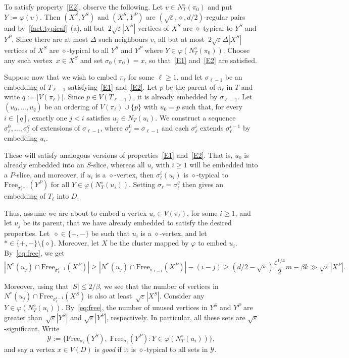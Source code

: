 \documentclass[11pt]{article}
\numberwithin{equation}{section}
\renewcommand{\geq}{\geqslant}
\renewcommand{\leq}{\leqslant}
\newcommand{\defi}[1]{\emph{\color{red!50!black}#1}}
\def\Free{\mathrm{Free}}
\let\eps=\varepsilon
\let\phi=\varphi
\theoremstyle{definition}
\def\eps{{\varepsilon}}
\begin{document}
To satisfy property~\ref{E2}, observe the following. Let $v \in N_T^{\diamond}(\pi_0)$ and put $Y := \phi(v)$. Then $(X^{S},Y^{S})$ and $(X^{S}, Y^{P})$ are $(\sqrt{\eps},\diamond,d/2)$-regular pairs and by~\cref{fact:typical}~(a), all but~$2\sqrt{\eps}|X^{S}|$ vertices of $X^{S}$ are $\diamond$-typical to $Y^{S}$ and $Y^{P}$. Since there are at most $\Delta$ such neighbours $v$,  all but at most~$2\sqrt{\eps} \Delta |X^{S}|$ vertices of $X^{S}$ are $\diamond$-typical to all $Y^{S}$ and $Y^{P}$ where $Y\in \phi(N^{\diamond}_T(\pi_0))$. Choose any such vertex~${x\in X^{S}}$ and set $\sigma_0(\pi_0) = x$, so that~\ref{E1} and~\ref{E2} are satisfied.

Suppose now that we wish to embed $\pi_\ell$ for some $\ell\geq 1$, and let $\sigma_{\ell-1}$ be an embedding of
$T_{\ell-1}$ satisfying~\ref{E1} and~\ref{E2}. Let $p$ be the parent of $\pi_\ell$ in $T$ and
write $q := |V(\pi_\ell)|$. Since $p \in V(T_{\ell-1})$, it is already embedded by $\sigma_{\ell-1}$.
Let $(u_0,\dots,u_{q})$ be an ordering of $V(\pi_\ell) \cup \{p \}$
with $u_0 = p$ such that, for every $i\in [q]$, exactly one $j<i$ satisfies $u_j \in N_T(u_i)$.
We construct a sequence $\sigma_{\ell}^{0},\dots,\sigma_{\ell}^{q}$ of extensions of $\sigma_{\ell-1}$,
where $\sigma_{\ell}^{0} = \sigma_{\ell-1}$ and each $\sigma_{\ell}^{i}$ extends $\sigma_{\ell}^{i-1}$ by embedding $u_i$. 

These will
satisfy analogous versions of properties~\ref{E1} and~\ref{E2}. That is, $u_0$ is already embedded into an $S$-slice, whereas all $u_i$ with $i\geq 1$ will be embedded into a $P$-slice, and moreover, if $u_i$ is a $\diamond$-vertex, then $\sigma_{\ell}^i(u_i)$ is $\diamond$-typical to $\Free_{\sigma_{\ell}^{i-1}}(Y^P)$ for all $Y\in \varphi(N^\diamond_T(u_i))$.
Setting $\sigma_{\ell} = \sigma_{\ell}^{q}$ then gives an embedding of $T_{\ell}$ into $D$.

Thus, assume we are about to embed a vertex $u_i \in V(\pi_\ell)$, for some $i \geq 1$, and let $u_j$ be its parent, that we have already embedded to satisfy the desired properties.
Let~$\diamond\in \{+,-\}$ be such that $u_i$ is a $\diamond$-vertex,
and let $\ast\in \{+,-\} \setminus \{\diamond\}$.
Moreover, let $X$ be the cluster mapped by $\varphi$ to embed $u_i$.
By~\eqref{eq:free}, we get
\[
  |N^{\ast}(u_j) \cap \Free_{\sigma_{\ell}^{i-1}}(X^{P})| \geq |N^{\ast}(u_j)\cap \Free_{\sigma_{\ell-1}}(X^{P})| - (i-j) \geq (d/2-\sqrt{\eps})\frac{\eps^{1/4}}{2}m - \beta k \gg \sqrt{\eps}|X^{P}|.
\]

Moreover, using that $|S| \leq 2/\beta$, we see that  the number of vertices in $N^{\ast}(u_j) \cap \Free_{\sigma_{\ell}^{i-1}}(X^{S})$
is also at least~$\sqrt{\eps}|X^{S}|$. Consider any~$Y\in \phi(N_T^{\diamond}(u_i))$. By~\eqref{eq:free},
the number of unused vertices in $Y^{S}$ and $Y^{P}$ are greater than~$\sqrt{\eps}|Y^S|$ and $\sqrt{\eps}|Y^{P}|$, respectively.
In particular, all these sets are $\sqrt{\eps}$-significant. Write
\[
    \mathcal{Y} := \{ \Free_{\sigma_{\ell}}(Y^S),\; \Free_{\sigma_{\ell}}(Y^{P}) : Y \in \phi(N^{\diamond}_T(u_i))\},
\]
and say a vertex $x \in V(D)$ is \defi{good} if it is $\diamond$-typical to all sets in $\mathcal{Y}$.
\end{document}
